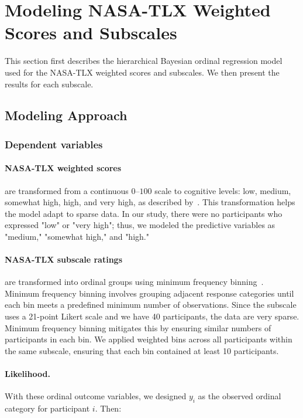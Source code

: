 \section{Modeling NASA-TLX Weighted Scores and Subscales}
\label{apdx:model_tlx}
This section first describes the hierarchical Bayesian ordinal regression model used for the NASA-TLX weighted scores and subscales. We then present the results for each subscale.

\subsection{Modeling Approach}

\subsubsection{Dependent variables}
\paragraph{NASA-TLX weighted scores} are transformed from a continuous $0$--$100$ scale to cognitive levels: low, medium, somewhat high, high, and very high, as described by~\citet{hart1988development}. This transformation helps the model adapt to sparse data. In our study, there were no participants who expressed "low" or "very high"; thus, we modeled the predictive variables as "medium," "somewhat high," and "high."

\paragraph{NASA-TLX subscale ratings} are transformed into ordinal groups using minimum frequency binning~\cite{frank2001simple}. Minimum frequency binning involves grouping adjacent response categories until each bin meets a predefined minimum number of observations. Since the subscale uses a 21-point Likert scale and we have 40 participants, the data are very sparse. Minimum frequency binning mitigates this by ensuring similar numbers of participants in each bin. We applied weighted bins across all participants within the same subscale, ensuring that each bin contained at least 10 participants.

\paragraph{Likelihood.} With these ordinal outcome variables, we designed $y_i$ as the observed ordinal category for participant $i$. Then:

